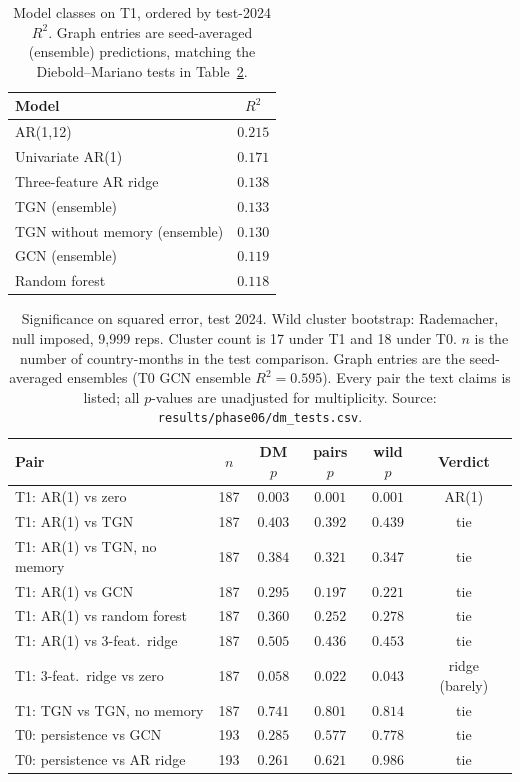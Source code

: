 \documentclass[10pt]{article}
\begin{document}
\begin{table}[t]
\centering
\caption{Model classes on T1, ordered by test-2024 $R^2$. Graph entries are seed-averaged (ensemble) predictions, matching the Diebold--Mariano tests in Table~\ref{tab:sig}.}
\label{tab:classes}
\footnotesize
\begin{tabular}{lc}
\toprule
\textbf{Model} & \textbf{$R^2$} \\
\midrule
AR(1,12) & $0.215$ \\
Univariate AR(1) & $0.171$ \\
Three-feature AR ridge & $0.138$ \\
TGN (ensemble) & $0.133$ \\
TGN without memory (ensemble) & $0.130$ \\
GCN (ensemble) & $0.119$ \\
Random forest & $0.118$ \\
\bottomrule
\end{tabular}
\end{table}

\begin{table}[t]
\centering
\caption{Significance on squared error, test 2024. Wild cluster bootstrap: Rademacher, null imposed, 9{,}999 reps. Cluster count is 17 under T1 and 18 under T0. $n$ is the number of country-months in the test comparison. Graph entries are the seed-averaged ensembles (T0 GCN ensemble $R^2=0.595$). Every pair the text claims is listed; all $p$-values are unadjusted for multiplicity. Source: \texttt{results/phase06/dm\_tests.csv}.}
\label{tab:sig}
\scriptsize
\begin{tabular}{l c ccc c}
\toprule
\textbf{Pair} & \textbf{$n$} & \textbf{DM $p$} & \textbf{pairs $p$} & \textbf{wild $p$} & \textbf{Verdict} \\
\midrule
T1: AR(1) vs zero & 187 & $0.003$ & $0.001$ & $0.001$ & AR(1) \\
T1: AR(1) vs TGN & 187 & $0.403$ & $0.392$ & $0.439$ & tie \\
T1: AR(1) vs TGN, no memory & 187 & $0.384$ & $0.321$ & $0.347$ & tie \\
T1: AR(1) vs GCN & 187 & $0.295$ & $0.197$ & $0.221$ & tie \\
T1: AR(1) vs random forest & 187 & $0.360$ & $0.252$ & $0.278$ & tie \\
T1: AR(1) vs 3-feat.\ ridge & 187 & $0.505$ & $0.436$ & $0.453$ & tie \\
\midrule
T1: 3-feat.\ ridge vs zero & 187 & $0.058$ & $0.022$ & $0.043$ & ridge (barely) \\
T1: TGN vs TGN, no memory & 187 & $0.741$ & $0.801$ & $0.814$ & tie \\
\midrule
T0: persistence vs GCN & 193 & $0.285$ & $0.577$ & $0.778$ & tie \\
T0: persistence vs AR ridge & 193 & $0.261$ & $0.621$ & $0.986$ & tie \\
\bottomrule
\end{tabular}
\end{table}
\end{document}
